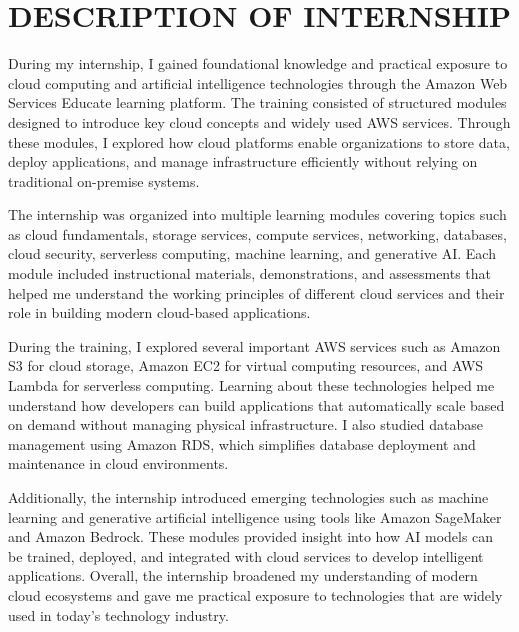 \documentclass[12pt, a4paper, oneside]{report}
\begin{document}
\chapter{DESCRIPTION OF INTERNSHIP}

During my internship, I gained foundational knowledge and practical exposure to cloud 
computing and artificial intelligence technologies through the Amazon Web Services 
Educate learning platform. The training consisted of structured modules designed to 
introduce key cloud concepts and widely used AWS services. Through these modules, I 
explored how cloud platforms enable organizations to store data, deploy applications, 
and manage infrastructure efficiently without relying on traditional on-premise systems.

The internship was organized into multiple learning modules covering topics such as 
cloud fundamentals, storage services, compute services, networking, databases, cloud 
security, serverless computing, machine learning, and generative AI. Each module 
included instructional materials, demonstrations, and assessments that helped me 
understand the working principles of different cloud services and their role in building 
modern cloud-based applications.

During the training, I explored several important AWS services such as Amazon S3 for 
cloud storage, Amazon EC2 for virtual computing resources, and AWS Lambda for 
serverless computing. Learning about these technologies helped me understand how 
developers can build applications that automatically scale based on demand without 
managing physical infrastructure. I also studied database management using Amazon 
RDS, which simplifies database deployment and maintenance in cloud environments.

Additionally, the internship introduced emerging technologies such as machine 
learning and generative artificial intelligence using tools like Amazon SageMaker 
and Amazon Bedrock. These modules provided insight into how AI models can be 
trained, deployed, and integrated with cloud services to develop intelligent applications. 
Overall, the internship broadened my understanding of modern cloud ecosystems and 
gave me practical exposure to technologies that are widely used in today's technology 
industry.

\end{document}
